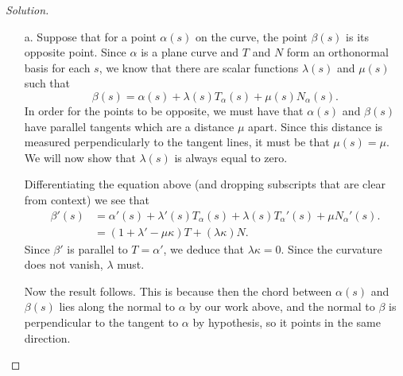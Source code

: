 \documentclass[Shifrin_Solutions_Spring_2018]{subfiles}
\begin{document}
\begin{proof}[Solution]$ \ $ \\
\begin{itemize}
\item[a.] Suppose that for a point $\alpha(s)$ on the curve, the point $\beta(s)$ is its opposite point. Since $\alpha$ is a plane curve and $T$ and $N$ form an orthonormal basis for each $s$, we know that there are scalar functions $\lambda(s)$ and $\mu(s)$ such that
\[
\beta(s) = \alpha(s) + \lambda(s) T_{\alpha}(s) + \mu(s) N_{\alpha}(s) .
\]
In order for the points to be opposite, we must have that $\alpha(s)$ and $\beta(s)$ have parallel tangents which are a distance $\mu$ apart. Since this distance is measured perpendicularly to the tangent lines, it must be that $\mu(s) = \mu$. We will now show that $\lambda(s)$ is always equal to zero.


Differentiating the equation above (and dropping subscripts that are clear from context) we see that
\[
\begin{split}
\beta'(s) & = \alpha'(s) + \lambda'(s) T_{\alpha}(s) + \lambda(s) T_{\alpha}'(s) + \mu N_{\alpha}'(s) .\\
	& = ( 1 + {\lambda}' - \mu \kappa ) T + ( \lambda \kappa ) N .
\end{split}
\]
Since $\beta'$ is parallel to $T = \alpha'$, we deduce that $\lambda\kappa= 0$. Since the curvature does not vanish, $\lambda$ must.

Now the result follows. This is because then the chord between $\alpha(s)$ and $\beta(s)$ lies along the normal to $\alpha$ by our work above, and the normal to $\beta$ is perpendicular to the tangent to $\alpha$ by hypothesis, so it points in the same direction. \\



\end{itemize}
\end{proof}
\end{document}
